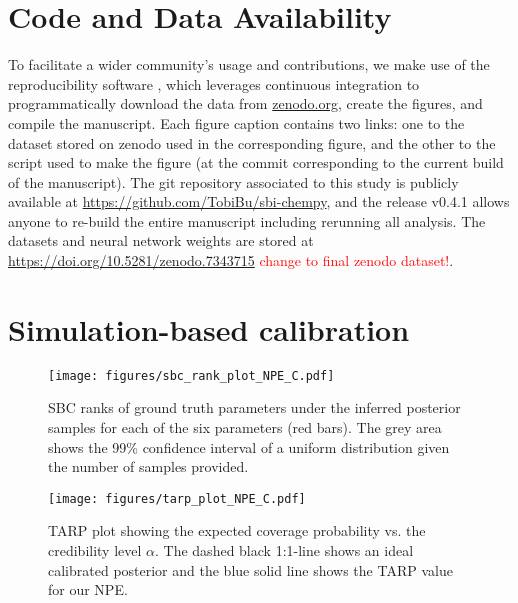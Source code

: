 \documentclass{aa}
\begin{document}
\begin{appendix}

\section{Code and Data Availability}
\label{sec:appendix_code_and_data}

To facilitate a wider community's usage and contributions, we make use of the reproducibility software
\href{https://github.com/showyourwork/showyourwork}{\showyourwork}
\citep{Luger2021}, which leverages continuous integration to
programmatically download the data from
\href{https://zenodo.org/}{zenodo.org}, create the figures, and
compile the manuscript. Each figure caption contains two links: one
to the dataset stored on zenodo used in the corresponding figure,
and the other to the script used to make the figure (at the commit
corresponding to the current build of the manuscript). The git
repository associated to this study is publicly available at
\url{https://github.com/TobiBu/sbi-chempy}, and the release
v0.4.1 allows anyone to re-build the entire manuscript including rerunning all analysis. The datasets and neural network weights are stored at \url{https://doi.org/10.5281/zenodo.7343715} \textcolor{red}{change to final zenodo dataset!}.


\section{Simulation-based calibration}
\label{sec:sbc}

\begin{figure*}[]
     \centering
     \texttt{[image: figures/sbc\_rank\_plot\_NPE\_C.pdf]}
     \caption{SBC ranks of ground truth parameters under the inferred posterior samples for each of the six parameters (red bars). The grey area shows the 99\% confidence interval of a uniform distribution given the number of samples provided.}
     \label{fig:sbc}
\end{figure*}

\begin{figure}[]
     \centering
     \texttt{[image: figures/tarp\_plot\_NPE\_C.pdf]}
     \caption{TARP plot showing the expected coverage probability vs. the credibility level $\alpha$. The dashed black 1:1-line shows an ideal calibrated posterior and the blue solid line shows the TARP value for our NPE.}
     \label{fig:tarp}
\end{figure}


\end{appendix}
\end{document}
